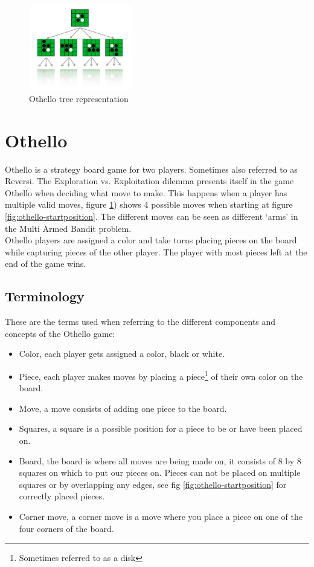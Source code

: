 \documentclass[
11pt, %
english, %
singlespacing, %
headsepline, %
]{MastersDoctoralThesis} %
\begin{document}
\begin{figure}[H]
	\centering
	\includegraphics[width=0.4\textwidth]{images/othello-gametree}
	\caption{Othello tree representation}
	\label{fig:othello-gametree}
\end{figure}
\section{Othello}
Othello is a strategy board game for two players. Sometimes also referred to as Reversi. The Exploration vs. Exploitation dilemma presents itself in the game Othello when deciding what move to make. This happens when a player has multiple valid moves, figure \ref{fig:othello-gametree}) shows 4 possible moves when starting at figure \ref{fig:othello-startposition}. The different moves can be seen as different `arms' in the Multi Armed Bandit problem.\\
Othello players are assigned a color and take turns placing pieces on the board while capturing pieces of the other player. The player with most pieces left at the end of the game wins.
\subsection{Terminology}
These are the terms used when referring to the different components and concepts of the Othello game:
\begin{itemize}
	\item Color, each player gets assigned a color, black or white.
	\item Piece, each player makes moves by placing a piece\footnote{Sometimes referred to as a disk} of their own color on the board.
	\item Move, a move consists of adding one piece to the board.
	\item Squares, a square is a possible position for a piece to be or have been placed on. 
	\item Board, the board is where all moves are being made on, it consists of 8 by 8 squares on which to put our pieces on. Pieces can not be placed on multiple squares or by overlapping any edges, see fig \ref{fig:othello-startposition} for correctly placed pieces.
	\item Corner move, a corner move is a move where you place a piece on one of the four corners of the board.

\end{itemize}
\end{document}
